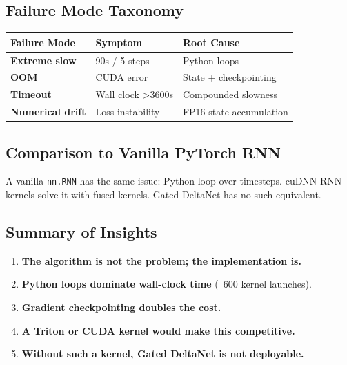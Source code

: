 \subsection{Failure Mode Taxonomy}

\begin{table}[H]
\centering
\small
\begin{tabular}{lll}
\toprule
\textbf{Failure Mode} & \textbf{Symptom} & \textbf{Root Cause} \\
\midrule
\textbf{Extreme slow} & 90s / 5 steps & Python loops \\
\textbf{OOM} & CUDA error & State + checkpointing \\
\textbf{Timeout} & Wall clock \textgreater{}3600s & Compounded slowness \\
\textbf{Numerical drift} & Loss instability & FP16 state accumulation \\
\bottomrule
\end{tabular}
\end{table}

\subsection{Comparison to Vanilla PyTorch RNN}

A vanilla \texttt{nn.RNN} has the same issue: Python loop over timesteps. cuDNN 
RNN kernels solve it with fused kernels. Gated DeltaNet has no such 
equivalent.

\subsection{Summary of Insights}

\begin{enumerate}
\item \textbf{The algorithm is not the problem; the implementation is.}
\item \textbf{Python loops dominate wall-clock time} (~600 kernel launches).
\item \textbf{Gradient checkpointing doubles the cost.}
\item \textbf{A Triton or CUDA kernel would make this competitive.}
\item \textbf{Without such a kernel, Gated DeltaNet is not deployable.}

\end{enumerate}
